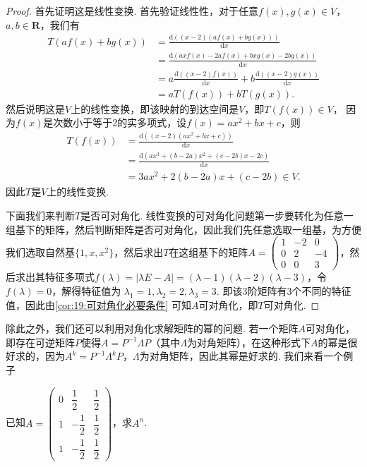 \begin{proof}
    首先证明这是线性变换. 首先验证线性性，对于任意$f(x),g(x)\in V$，$a,b\in\mathbf{R}$，我们有
    \begin{align*}
        T(af(x)+bg(x)) & =\frac{\mathrm{d}((x-2)(af(x)+bg(x)))}{\mathrm{d}x}                                    \\
                       & =\frac{\mathrm{d}(axf(x)-2af(x)+bxg(x)-2bg(x))}{\mathrm{d}x}                           \\
                       & =a\frac{\mathrm{d}((x-2)f(x))}{\mathrm{d}x}+b\frac{\mathrm{d}((x-2)g(x))}{\mathrm{d}x} \\
                       & =aT(f(x))+bT(g(x)).
    \end{align*}
    然后说明这是$V$上的线性变换，即该映射的到达空间是$V$，即$T(f(x))\in V$， 因为$f(x)$是次数小于等于2的实多项式，设$f(x)=ax^2+bx+c$，则
    \begin{align*}
        T(f(x)) & =\frac{\mathrm{d}((x-2)(ax^2+bx+c))}{\mathrm{d}x}          \\
                & =\frac{\mathrm{d}(ax^3+(b-2a)x^2+(c-2b)x-2c)}{\mathrm{d}x} \\
                & =3ax^2+2(b-2a)x+(c-2b)\in V.
    \end{align*}
    因此$T$是$V$上的线性变换.

    下面我们来判断$T$是否可对角化. 线性变换的可对角化问题第一步要转化为任意一组基下的矩阵，然后判断矩阵是否可对角化，因此我们先任意选取一组基，为方便我们选取自然基$\{1,x,x^2\}$，然后求出$T$在这组基下的矩阵$A=\begin{pmatrix}
            1 & -2 & 0 \\ 0 & 2 & -4 \\ 0 & 0 & 3
        \end{pmatrix}$，然后求出其特征多项式$f(\lambda)=|\lambda E-A|=(\lambda-1)(\lambda-2)(\lambda-3)$，令$f(\lambda)=0$，解得特征值为 $\lambda_1=1,\lambda_2=2,\lambda_3=3$. 即该3阶矩阵有3个不同的特征值，因此由\autoref{cor:19:可对角化必要条件} 可知$A$可对角化，即$T$可对角化.
\end{proof}

除此之外，我们还可以利用对角化求解矩阵的幂的问题. 若一个矩阵$A$可对角化，即存在可逆矩阵$P$使得$A=P^{-1}\varLambda P$（其中$\varLambda$为对角矩阵），在这种形式下$A$的幂是很好求的，因为$A^k=P^{-1}\varLambda^kP$，$\varLambda$为对角矩阵，因此其幂是好求的. 我们来看一个例子
\begin{example}
    已知$A=\begin{pmatrix}
            0 & \dfrac{1}{2}  & \dfrac{1}{2} \\[2ex]
            1 & -\dfrac{1}{2} & \dfrac{1}{2} \\[2ex]
            1 & -\dfrac{1}{2} & \dfrac{1}{2}
        \end{pmatrix}$，求$A^n$.
\end{example}

